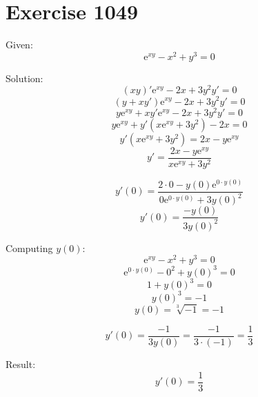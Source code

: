 \documentclass[a4paper, 10pt]{scrartcl}
\newcommand*\euler{\mathrm{e}}
\begin{document}
\section{Exercise 1049}

Given:
\[
\euler^{xy} - x^{2} + y^{3} = 0
\]

Solution:
\[
(xy)'\euler^{xy} - 2x + 3y^{2}y' = 0
\]
\[
(y + xy')\euler^{xy} - 2x + 3y^{2}y' = 0
\]
\[
y\euler^{xy} + xy'\euler^{xy} - 2x + 3y^{2}y' = 0
\]
\[
y\euler^{xy} + y'(x\euler^{xy} + 3y^{2}) - 2x = 0
\]
\[
y'(x\euler^{xy} + 3y^{2}) = 2x - y\euler^{xy}
\]
\[
y' = \frac{2x - y\euler^{xy}}{x\euler^{xy} + 3y^{2}}
\]

\[
y'(0) = \frac{2\cdot 0 - y(0)\euler^{0\cdot y(0)}}{0\euler^{0\cdot y(0)} + 3y(0)^{2}}
\]
\[
y'(0) = \frac{-y(0)}{3y(0)^{2}}
\]

Computing $y(0)$:
\[
\euler^{xy} - x^{2} + y^{3} = 0
\]
\[
\euler^{0\cdot y(0)} - 0^{2} + y(0)^{3} = 0
\]
\[
1 + y(0)^{3} = 0
\]
\[
y(0)^{3} = -1
\]
\[
y(0) = \sqrt[3]{-1} = -1
\]

\[
y'(0) = \frac{-1}{3y(0)} = \frac{-1}{3\cdot(-1)} = \frac{1}{3}
\]

Result:
\[
y'(0) = \frac{1}{3}
\]
\end{document}
